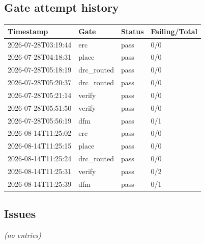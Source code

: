\documentclass[11pt,a4paper]{article}
\begin{document}
\subsection*{Gate attempt history}
{\small
\begin{longtable}{llll}
\toprule
\textbf{Timestamp} & \textbf{Gate} & \textbf{Status} & \textbf{Failing/Total} \\
\midrule
\endhead
2026-07-28T03:19:44 & erc & pass & 0/0 \\
2026-07-28T04:18:31 & place & pass & 0/0 \\
2026-07-28T05:18:19 & drc\_routed & pass & 0/0 \\
2026-07-28T05:20:37 & drc\_routed & pass & 0/0 \\
2026-07-28T05:21:14 & verify & pass & 0/0 \\
2026-07-28T05:51:50 & verify & pass & 0/0 \\
2026-07-28T05:56:19 & dfm & pass & 0/1 \\
2026-08-14T11:25:02 & erc & pass & 0/0 \\
2026-08-14T11:25:15 & place & pass & 0/0 \\
2026-08-14T11:25:24 & drc\_routed & pass & 0/0 \\
2026-08-14T11:25:31 & verify & pass & 0/2 \\
2026-08-14T11:25:39 & dfm & pass & 0/1 \\
\bottomrule
\end{longtable}
}
\subsection*{Issues}
\emph{(no entries)}
\end{document}
